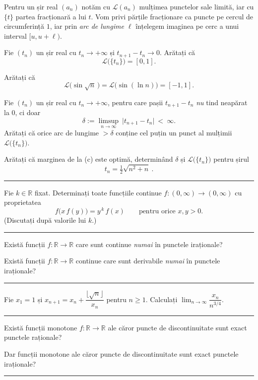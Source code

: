 Pentru un șir real $(a_n)$ notăm cu $\mathcal{L}(a_n)$ mulțimea punctelor sale limită, iar cu $\{t\}$ partea fracționară a lui $t$. Vom privi părțile fracționare ca puncte pe cercul de circumferință $1$, iar prin \emph{arc de lungime $\ell$} înțelegem imaginea pe cerc a unui interval $[u,u+\ell)$.
\begin{parti}
  \item Fie $(t_n)$ un șir real cu $t_n\to+\infty$ și $t_{n+1}-t_n\to0$. Arătați că
  \[ \mathcal{L}\bigl(\{t_n\}\bigr)=[0,1] . \]
  \item Arătați că
  \[ \mathcal{L}\bigl(\sin\sqrt n\,\bigr)=\mathcal{L}\bigl(\sin(\ln n)\bigr)=[-1,1] . \]
  \item Fie $(t_n)$ un șir real cu $t_n\to+\infty$, pentru care pașii $t_{n+1}-t_n$ \emph{nu} tind neapărat la $0$, ci doar
  \[ \delta:=\limsup_{n\to\infty}\ \bigl|t_{n+1}-t_n\bigr|\ <\ \infty . \]
  Arătați că orice arc de lungime $>\delta$ conține cel puțin un punct al mulțimii $\mathcal{L}\bigl(\{t_n\}\bigr)$.
  \item Arătați că marginea de la (c) este optimă, determinând $\delta$ și $\mathcal{L}\bigl(\{t_n\}\bigr)$ pentru șirul
  \[ t_n=\tfrac12\sqrt{n^{2}+n}\ . \]
\end{parti}
\vspace{1mm}\hrule

Fie $k\in\mathbb{R}$ fixat. Determinați toate funcțiile continue $f:(0,\infty)\to(0,\infty)$ cu proprietatea
\[ f\bigl(x\,f(y)\bigr)=y^{\,k}\,f(x)\qquad\text{pentru orice }x,y>0 . \]
(Discutați după valorile lui $k$.)
\vspace{1mm}\hrule

\begin{parti}
\item Există funcții $f:\mathbb{R}\to\mathbb{R}$ care sunt continue \emph{numai} în punctele iraționale?
\item Există funcții $f:\mathbb{R}\to\mathbb{R}$ continue care sunt derivabile \emph{numai} în punctele iraționale?
\end{parti}
\vspace{1mm}\hrule

Fie $x_1 = 1$ și $x_{n+1} = x_n + \dfrac{\lfloor\sqrt{n}\rfloor}{x_n}$ pentru $n \geq 1$. Calculați $\displaystyle\lim_{n\to\infty} \dfrac{x_n}{n^{3/4}}$.
\vspace{1mm}\hrule

\begin{parti}
  \item Există funcții monotone $f:\mathbb{R}\to\mathbb{R}$ ale căror puncte de discontinuitate sunt exact punctele raționale?
  \item Dar funcții monotone ale căror puncte de discontinuitate sunt exact punctele iraționale?
\end{parti}
\vspace{1mm}\hrule

